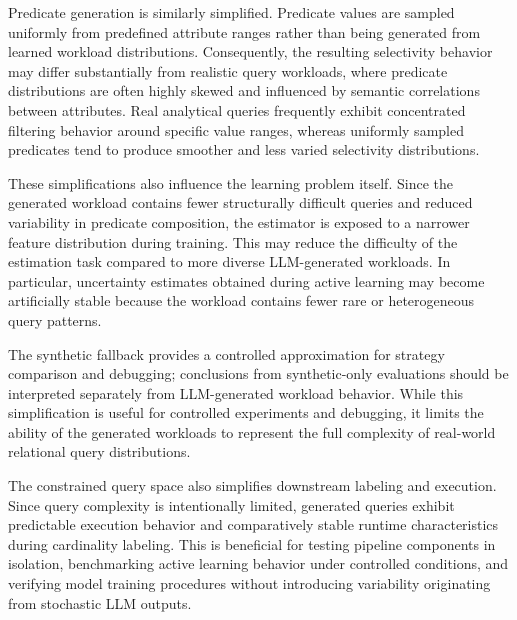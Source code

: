 Predicate generation is similarly simplified. Predicate values are sampled uniformly from predefined attribute ranges rather than being generated from learned workload distributions. Consequently, the resulting selectivity behavior may differ substantially from realistic query workloads, where predicate distributions are often highly skewed and influenced by semantic correlations between attributes. Real analytical queries frequently exhibit concentrated filtering behavior around specific value ranges, whereas uniformly sampled predicates tend to produce smoother and less varied selectivity distributions.

These simplifications also influence the learning problem itself. Since the generated workload contains fewer structurally difficult queries and reduced variability in predicate composition, the estimator is exposed to a narrower feature distribution during training. This may reduce the difficulty of the estimation task compared to more diverse LLM-generated workloads. In particular, uncertainty estimates obtained during active learning may become artificially stable because the workload contains fewer rare or heterogeneous query patterns.

The synthetic fallback provides a controlled approximation for strategy comparison and debugging; conclusions from synthetic-only evaluations should be interpreted separately from LLM-generated workload behavior. While this simplification is useful for controlled experiments and debugging, it limits the ability of the generated workloads to represent the full complexity of real-world relational query distributions.

The constrained query space also simplifies downstream labeling and execution. Since query complexity is intentionally limited, generated queries exhibit predictable execution behavior and comparatively stable runtime characteristics during cardinality labeling. This is beneficial for testing pipeline components in isolation, benchmarking active learning behavior under controlled conditions, and verifying model training procedures without introducing variability originating from stochastic LLM outputs.